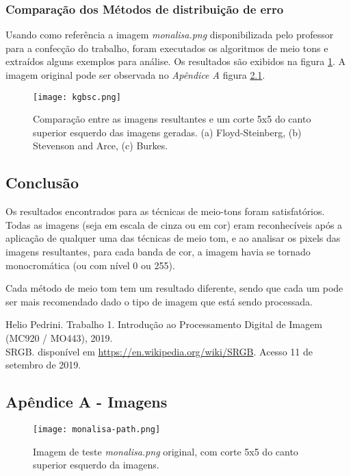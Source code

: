\documentclass[conference]{IEEEtran}
\begin{document}
 \subsection{Comparação dos Métodos de distribuição de erro}

 Usando como referência a imagem \textit{monalisa.png} disponibilizada pelo professor para a confecção do trabalho, foram executados os algoritmos de meio tons e extraídos alguns exemplos para análise. Os resultados são exibidos na figura \ref{fig:comparison}. A imagem original pode ser observada no \textit{Apêndice A} figura \ref{fig:monalisa}.

 \begin{figure}[ht]
     \centering
     \texttt{[image: kgbsc.png]}
     \caption{Comparação entre as imagens resultantes e um corte 5x5 do canto superior esquerdo das imagens geradas. (a) Floyd-Steinberg, (b) Stevenson and Arce, (c) Burkes.}
     \label{fig:comparison}
 \end{figure}

 \section{Conclusão}
 Os resultados encontrados para as técnicas de meio-tons foram satisfatórios. Todas as imagens (seja em escala de cinza ou em cor) eram reconhecíveis após a aplicação de qualquer uma das técnicas de meio tom, e ao analisar os pixels das imagens resultantes, para cada banda de cor, a imagem havia se tornado monocromática (ou com nível 0 ou 255).

 Cada método de meio tom tem um resultado diferente, sendo que cada um pode ser mais recomendado dado o tipo de imagem que está sendo processada.

\begin{thebibliography}{00}

 Helio Pedrini. Trabalho 1. Introdução ao Processamento Digital de Imagem (MC920 / MO443), 2019.\\

 SRGB. disponível em \url{https://en.wikipedia.org/wiki/SRGB}. Acesso 11 de setembro de 2019.

\end{thebibliography}

\newpage
\newpage
\begin{appendices}
\chapter{Apêndice A - Imagens}
 \begin{figure}[ht]
     \centering
     \texttt{[image: monalisa-path.png]}
     \caption{Imagem de teste \textit{monalisa.png} original, com corte 5x5 do canto superior esquerdo da imagens.}
     \label{fig:monalisa}
 \end{figure}

\end{appendices}
\end{document}
